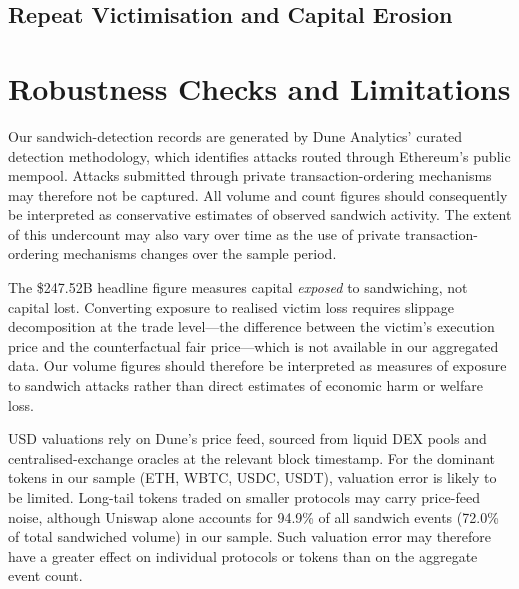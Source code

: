 \documentclass[pdflatex, sn-basic]{sn-jnl}
\theoremstyle{thmstylethree}%
\begin{document}
	\subsection{Repeat Victimisation and Capital Erosion}
	\label{subsec:repeat-victimization}


	\section{Robustness Checks and Limitations}
	\label{sec:robustness}


    Our sandwich-detection records are generated by Dune Analytics' curated detection methodology, which identifies attacks routed through Ethereum's public mempool.
    Attacks submitted through private transaction-ordering mechanisms may therefore not be captured.
    All volume and count figures should consequently be interpreted as conservative estimates of observed sandwich activity.
    The extent of this undercount may also vary over time as the use of private transaction-ordering mechanisms changes over the sample period.
    
    The \$\num{247.52}B headline figure measures capital \emph{exposed} to sandwiching, not capital lost.
    Converting exposure to realised victim loss requires slippage decomposition at the trade level---the difference between the victim's execution price and the counterfactual fair price---which is not available in our aggregated data.
    Our volume figures should therefore be interpreted as measures of exposure to sandwich attacks rather than direct estimates of economic harm or welfare loss.
    
    USD valuations rely on Dune's price feed, sourced from liquid \ac{DEX} pools and centralised-exchange oracles at the relevant block timestamp.
    For the dominant tokens in our sample (ETH, WBTC, USDC, USDT), valuation error is likely to be limited.
    Long-tail tokens traded on smaller protocols may carry price-feed noise, although Uniswap alone accounts for \num{94.9}\% of all sandwich events (\num{72.0}\% of total sandwiched volume) in our sample.
    Such valuation error may therefore have a greater effect on individual protocols or tokens than on the aggregate event count.
    
\end{document}
